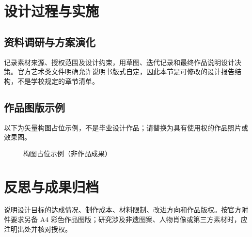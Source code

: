 \section{设计过程与实施}
\subsection{资料调研与方案演化}
记录素材来源、授权范围及设计约束，用草图、迭代记录和最终作品说明设计决策。官方艺术类文件明确允许说明书版式自定，因此本节是可修改的设计报告结构，不是学校规定的章节清单。
\subsection{作品图版示例}
以下为矢量构图占位示例，不是毕业设计作品；请替换为具有使用权的作品照片或效果图。
\begin{figure}[htbp]\centering
{}
\caption{构图占位示例（非作品成果）}
\end{figure}
\section{反思与成果归档}
说明设计目标的达成情况、制作成本、材料限制、改进方向和作品版权。按官方附件要求另备 A4 彩色作品图版；研究涉及非遗图案、人物肖像或第三方素材时，应注明出处并核对授权。
